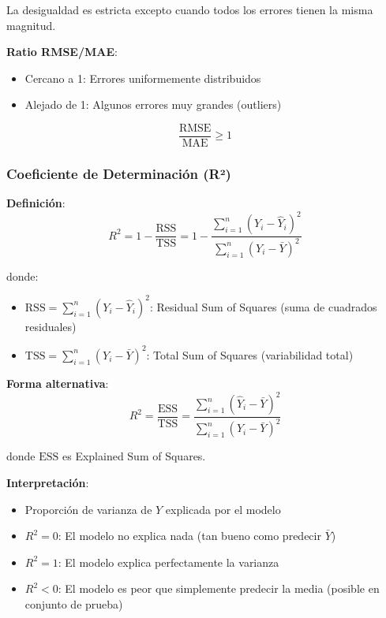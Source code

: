 \documentclass[
  doc,
  floatsintext,
  longtable,
  a4paper,
  nolmodern,
  notxfonts,
  notimes,
  12pt,
  colorlinks=true,linkcolor=blue,citecolor=blue,urlcolor=blue]{apa7}
\providecommand{\tightlist}{%
  \setlength{\itemsep}{0pt}\setlength{\parskip}{0pt}}
\begin{document}
La desigualdad es estricta excepto cuando todos los errores tienen la
misma magnitud.

\textbf{Ratio RMSE/MAE}:

\begin{itemize}
\tightlist
\item
  Cercano a 1: Errores uniformemente distribuidos
\item
  Alejado de 1: Algunos errores muy grandes (outliers)
\end{itemize}

\[
\frac{\text{RMSE}}{\text{MAE}} \geq 1
\]

\subsubsection{Coeficiente de Determinación
(R²)}\label{coeficiente-de-determinaciuxf3n-ruxb2}

\textbf{Definición}: \[
R^2 = 1 - \frac{\text{RSS}}{\text{TSS}} = 1 - \frac{\sum_{i=1}^{n}(Y_i - \hat{Y}_i)^2}{\sum_{i=1}^{n}(Y_i - \bar{Y})^2}
\]

donde:

\begin{itemize}
\tightlist
\item
  \(\text{RSS} = \sum_{i=1}^{n}(Y_i - \hat{Y}_i)^2\): Residual Sum of
  Squares (suma de cuadrados residuales)
\item
  \(\text{TSS} = \sum_{i=1}^{n}(Y_i - \bar{Y})^2\): Total Sum of Squares
  (variabilidad total)
\end{itemize}

\textbf{Forma alternativa}: \[
R^2 = \frac{\text{ESS}}{\text{TSS}} = \frac{\sum_{i=1}^{n}(\hat{Y}_i - \bar{Y})^2}{\sum_{i=1}^{n}(Y_i - \bar{Y})^2}
\]

donde \(\text{ESS}\) es Explained Sum of Squares.

\textbf{Interpretación}:

\begin{itemize}
\tightlist
\item
  Proporción de varianza de \(Y\) explicada por el modelo
\item
  \(R^2 = 0\): El modelo no explica nada (tan bueno como predecir
  \(\bar{Y}\))
\item
  \(R^2 = 1\): El modelo explica perfectamente la varianza
\item
  \(R^2 < 0\): El modelo es peor que simplemente predecir la media
  (posible en conjunto de prueba)
\end{itemize}
\end{document}
